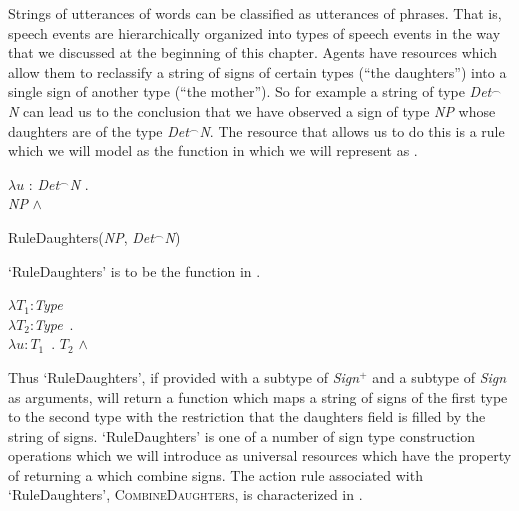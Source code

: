 Strings of utterances of words can be classified as utterances of
phrases.  That is, speech events are hierarchically organized into
types of speech events in the way that we discussed at the beginning
of this chapter.  Agents have resources which allow them to reclassify
a string of signs of certain types (``the daughters'') into a single
sign of another type (``the mother'').  So for example a string of
type \textit{Det}$^{\frown}$\textit{N} can lead us to the conclusion
that we have observed a sign of type \textit{NP} whose daughters are
of the type \textit{Det}$^{\frown}$\textit{N}.  The resource that
allows us to do this is a rule which we will
model as the function in  which we will represent as .
\begin{ex}
\begin{subex} 
\item $\lambda u$ : \textit{Det}$^{\frown}$\textit{N} . \\
\hspace*{1em}\textit{NP} \d{$\wedge$}

\item RuleDaughters(\textit{NP}, \textit{Det}$^{\frown}$\textit{N})
\end{subex}
\label{ex:NPDetNDaughters}
\end{ex}



`RuleDaughters' is to be the function in \nexteg{}.
\begin{ex} 
$\lambda T_1$:\textit{Type} \\
\hspace*{1em} $\lambda T_2$:\textit{Type}\ . \\
\hspace*{2em} $\lambda u\! :\! T_1$\ . $T_2$ \d{$\wedge$}  
\end{ex} 
Thus `RuleDaughters', if provided with a subtype of \textit{Sign}$^+$
and a subtype of \textit{Sign} as arguments, will return a function which 
maps a string of signs of the first type to the second type with the
restriction that the daughters field is filled by the string of
signs. `RuleDaughters' is one of a number of sign type construction
operations which we will introduce as universal resources which have
the property of returning a which combine signs.  The action rule
associated with `RuleDaughters', \textsc{CombineDaughters}, is characterized in
\nexteg{}.

